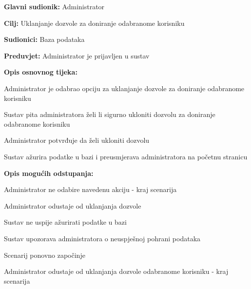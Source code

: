 					\noindent {}
					\begin{packed_item}
	
						\item \textbf{Glavni sudionik: }Administrator
						\item  \textbf{Cilj:} Uklanjanje dozvole za doniranje odabranome korisniku
						\item  \textbf{Sudionici:} Baza podataka
						\item  \textbf{Preduvjet:} Administrator je prijavljen u sustav
						\item  \textbf{Opis osnovnog tijeka:}
						
						\item[] \begin{packed_enum}
							\item Administrator je odabrao opciju za uklanjanje dozvole za doniranje odabranome korisniku
							\item Sustav pita administratora želi li sigurno ukloniti dozvolu za doniranje odabranome korisniku
							\item Administrator potvrđuje da želi ukloniti dozvolu
							\item Sustav ažurira podatke u bazi i preusmjerava administratora na početnu stranicu
						\end{packed_enum}

						\eject

						\item  \textbf{Opis mogućih odstupanja:}

						\item[] \begin{packed_item}
							\item[1.a] Administrator ne odabire navedenu akciju - kraj scenarija
							\item[3.a] Administrator odustaje od uklanjanja dozvole
							\item[4.a] Sustav ne uspije ažurirati podatke u bazi
							\item[] \begin{packed_enum}
								\item Sustav upozorava administratora o neuspješnoj pohrani podataka
								\item
									\begin{packed_enum}
										\item Scenarij ponovno započinje 
										\item Administrator odustaje od uklanjanja dozvole odabranome korisniku - kraj scenarija
									\end{packed_enum}
							\end{packed_enum}					
						\end{packed_item}
					\end{packed_item}

